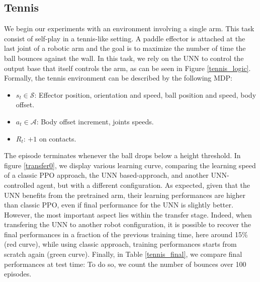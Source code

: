 \documentclass[letterpaper, 10 pt, conference]{ieeeconf}  %
\begin{document}
\subsection{Tennis} %
\label{sub:tennis}

We begin our experiments with an environment involving a single arm. This task consist of self-play in a tennis-like setting. A paddle effector is attached at the last joint of a robotic arm and the goal is to maximize the number of time the ball bounces against the wall. In this task, we rely on the UNN to control the output base that itself controls the arm, as can be seen in Figure \ref{tennis_logic}. Formally, the tennis environment can be described by the following MDP: 

\begin{itemize}
    \item $s_t \in \mathcal{S}$: Effector position, orientation and speed, ball position and speed, body offset.
    \item $a_t \in \mathcal{A}$: Body offset increment, joints speeds. 
    \item $R_t$: $+1$ on contacts. 
  \end{itemize}  

The episode terminates whenever the ball drops below a height threshold. 
In figure \ref{transfer0}, we display various learning curve, comparing the learning speed of a classic PPO approach, the UNN based-approach, and another UNN-controlled agent, but with a different configuration. As expected, given that the UNN benefits from the pretrained arm, their learning performances are higher than classic PPO, even if final performance for the UNN is slightly better. However, the most important aspect lies within the transfer stage. Indeed, when transfering the UNN to another robot configuration, it is possible to recover the final performances in a fraction of the previous training time, here around 15\% (red curve), while using classic approach, training performances starts from scratch again (green curve). Finally, in Table \ref{tennis_final}, we compare final performances at test time: To do so, we count the number of bounces over 100 episodes.  
\end{document}
